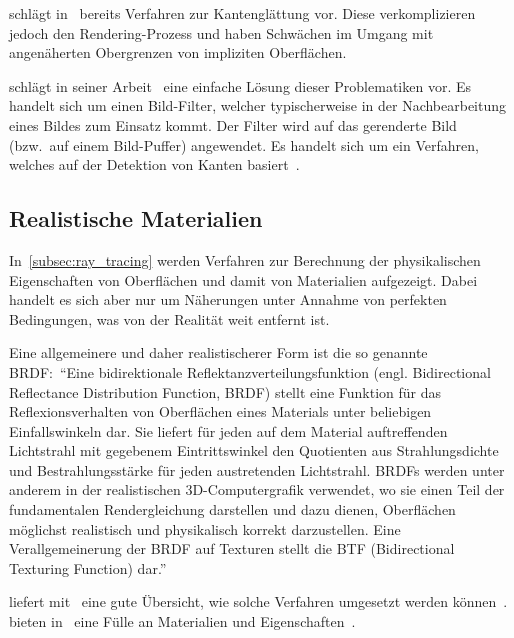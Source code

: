 \citeauthor{hart_sphere_1994} schlägt in~
bereits Verfahren zur Kantenglättung vor. Diese verkomplizieren jedoch
den Rendering-Prozess und haben Schwächen im Umgang mit angenäherten
Obergrenzen von impliziten Oberflächen.

\citeauthor{lottes_fxaa_2009} schlägt in seiner
Arbeit~ eine einfache Lösung dieser
Problematiken vor. Es handelt sich um einen Bild-Filter, welcher
typischerweise in der Nachbearbeitung eines Bildes zum Einsatz kommt.
Der Filter wird auf das gerenderte Bild (bzw.\ auf einem Bild-Puffer)
angewendet. Es handelt sich um ein Verfahren, welches auf der
Detektion von Kanten basiert~\parencite{lottes_fxaa_2009}.

\subsection{Realistische Materialien}
\label{subsec:further_work:brdf}

In~\autoref{subsec:ray_tracing} werden Verfahren zur Berechnung der
physikalischen Eigenschaften von Oberflächen und damit von Materialien
aufgezeigt. Dabei handelt es sich aber nur um Näherungen unter Annahme
von perfekten Bedingungen, was von der Realität weit entfernt ist.

Eine allgemeinere und daher realistischerer Form ist die so genannte
BRDF:\ ``Eine bidirektionale Reflektanzverteilungsfunktion (engl.
Bidirectional Reflectance Distribution Function, BRDF) stellt eine
Funktion für das Reflexionsverhalten von Oberflächen eines Materials
unter beliebigen Einfallswinkeln dar. Sie liefert für jeden auf dem
Material auftreffenden Lichtstrahl mit gegebenem Eintrittswinkel den
Quotienten aus Strahlungsdichte und Bestrahlungsstärke für jeden
austretenden Lichtstrahl. BRDFs werden unter anderem in der
realistischen 3D-Computergrafik verwendet, wo sie einen Teil der
fundamentalen Rendergleichung darstellen und dazu dienen, Oberflächen
möglichst realistisch und physikalisch korrekt darzustellen. Eine
Verallgemeinerung der BRDF auf Texturen stellt die BTF (Bidirectional
Texturing Function)
dar.''~\parencite{wikipedia_the_free_encyclopedia_bidirektionale_2014}

\citeauthor{burley_physicall-based_2012} liefert
mit~ eine gute Übersicht,
wie solche Verfahren umgesetzt werden
können~\parencite{burley_physicall-based_2012}.
\citeauthor{bagher_accurate_2012} bieten
in~ eine Fülle an Materialien und
Eigenschaften~\parencite{bagher_accurate_2012}.

